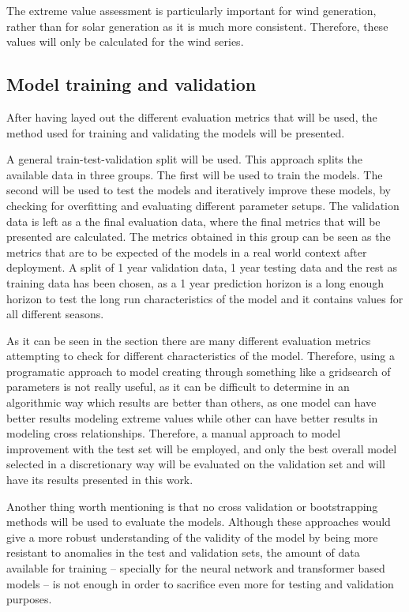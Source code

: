 The extreme value assessment is particularly important for wind generation, rather than for solar generation as it is much more consistent. Therefore, these values will only be calculated for the wind series. 

\subsection{Model training and validation}
\label{s:model-training-and-validation}
After having layed out the different evaluation metrics that will be used, the method used for training and validating the models will be presented. 

A general train-test-validation split will be used. This approach splits the available data in three groups. The first will be used to train the models. The second will be used to test the models and iteratively improve these models, by checking for overfitting and evaluating different parameter setups. The validation data is left as a the final evaluation data, where the final metrics that will be presented are calculated. The metrics obtained in this group can be seen as the metrics that are to be expected of the models in a real world context after deployment. A split of 1 year validation data, 1 year testing data and the rest as training data has been chosen, as a 1 year prediction horizon is a long enough horizon to test the long run characteristics of the model and it contains values for all different seasons. 

As it can be seen in the  section there are many different evaluation metrics attempting to check for different characteristics of the model. Therefore, using a programatic approach to model creating through something like a gridsearch of parameters is not really useful, as it can be difficult to determine in an algorithmic way which results are better than others, as one model can have better results modeling extreme values while other can have better results in modeling cross relationships. Therefore, a manual approach to model improvement with the test set will be employed, and only the best overall model selected in a discretionary way will be evaluated on the validation set and will have its results presented in this work.

Another thing worth mentioning is that no cross validation or bootstrapping methods will be used to evaluate the models. Although these approaches would give a more robust understanding of the validity of the model by being more resistant to anomalies in the test and validation sets, the amount of data available for training -- specially for the neural network and transformer based models -- is not enough in order to sacrifice even more for testing and validation purposes.

